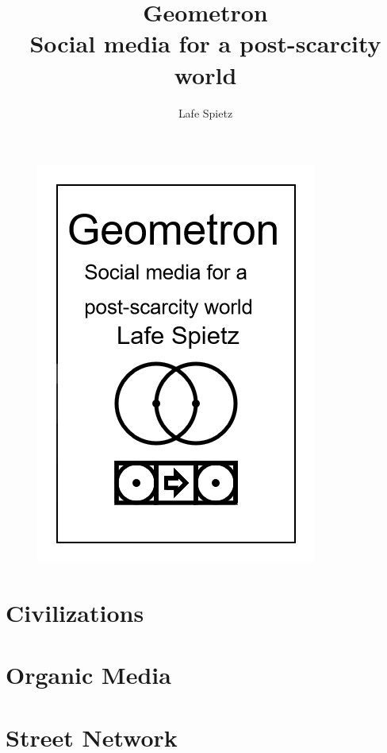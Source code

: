 \documentclass[ebook,12pt,openany]{memoir} %
\title{Geometron \\ Social media for a post-scarcity world}
\author{Lafe Spietz}
\begin{document}
\frontmatter
\begin{figure}[htbp]
\centering
\includegraphics{cover.png}
\end{figure}

\clearpage

\clearpage

\newpage
\thispagestyle{empty}
\mbox{}

\maketitle

\tableofcontents

\listoffigures 

%

\mainmatter

\chapter{Civilizations}

\chapter{Organic Media}

\chapter{Street Network}

\end{document}
